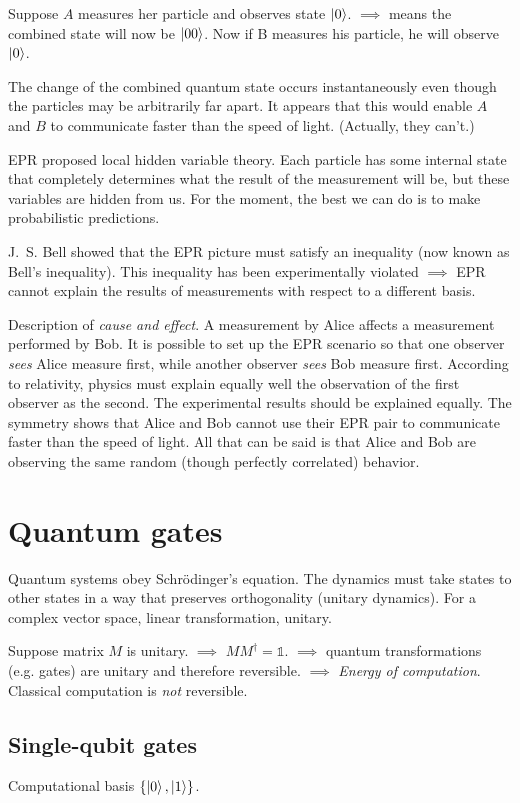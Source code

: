 \documentclass[12pt]{article}
\newcommand*\id{\mathds{1}}
\begin{document}
Suppose $A$ measures her particle and observes state $\ket{0}$. $\implies$
means the combined state will now be $\ket{00}$. Now if B measures his
particle, he will observe $\ket{0}$.

The change of the combined quantum state occurs instantaneously even though the
particles may be arbitrarily far apart. It appears that this would enable $A$
and $B$ to communicate faster than the speed of light. (Actually, they can't.)

EPR proposed local hidden variable theory. Each particle has some internal
state that completely determines what the result of the measurement will be,
but these variables are hidden from us. For the moment, the best we can do is
to make probabilistic predictions.

J.~S. Bell showed that the EPR picture must satisfy an inequality (now known as
Bell's inequality). This inequality has been experimentally violated $\implies$
EPR cannot explain the results of measurements with respect to a different
basis.

Description of \emph{cause and effect}. A measurement by Alice affects a
measurement performed by Bob. It is possible to set up the EPR scenario so that
one observer \emph{sees} Alice measure first, while another observer
\emph{sees} Bob measure first. According to relativity, physics must explain
equally well the observation of the first observer as the second. The
experimental results should be explained equally. The symmetry shows that Alice
and Bob cannot use their EPR pair to communicate faster than the speed of
light. All that can be said is that Alice and Bob are observing the same random
(though perfectly correlated) behavior.


\section{Quantum gates}
Quantum systems obey Schr\"odinger's equation. The dynamics must take states to
other states in a way that preserves orthogonality (unitary dynamics). For a
complex vector space, linear transformation, unitary.

Suppose matrix $M$ is unitary. $\implies$ $MM^\dag = \id$. $\implies$ quantum
transformations (e.g. gates) are unitary and therefore reversible. $\implies$
\emph{Energy of computation}. Classical computation is \emph{not} reversible.

\subsection{Single-qubit gates}
Computational basis $\{\ket{0}, \ket{1}\}$.
\end{document}

